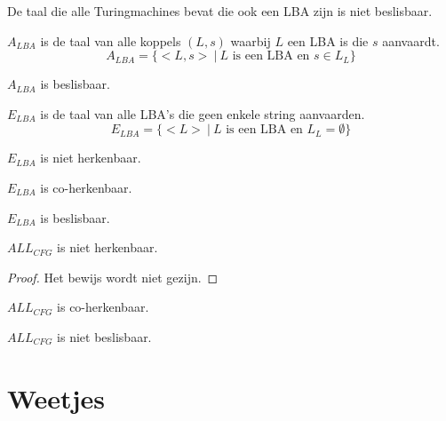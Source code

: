 \documentclass[main.tex]{subfiles}
\begin{document}
\begin{st}
  De taal die alle Turingmachines bevat die ook een LBA zijn is niet beslisbaar.
\end{st}

\begin{de}
  \label{de:a-lba}
  $A_{LBA}$ is de taal van alle koppels $(L,s)$ waarbij $L$ een LBA is die $s$ aanvaardt.
  \[ A_{LBA} = \{ <L,s> \ |\ L \text{ is een LBA en } s \in L_{L}\} \]
\end{de}

\begin{st}
  $A_{LBA}$ is beslisbaar.
\end{st}

\begin{de}
  \label{de:e-lba}
  $E_{LBA}$ is de taal van alle LBA's die geen enkele string aanvaarden.
  \[ E_{LBA} = \{ <L> \ |\ L \text{ is een LBA en } L_{L} = \emptyset \} \]
\end{de}

\begin{st}
  $E_{LBA}$ is niet herkenbaar.
\end{st}

\begin{st}
  $E_{LBA}$ is co-herkenbaar.
\end{st}

\begin{gev}
  $E_{LBA}$ is beslisbaar.
\end{gev}


\begin{st}
  $ALL_{CFG}$ is niet herkenbaar.
  \begin{proof}
    Het bewijs wordt niet gezijn.
  \end{proof}
\end{st}

\begin{st}
  $ALL_{CFG}$ is co-herkenbaar.
\end{st}

\begin{gev}
  $ALL_{CFG}$ is niet beslisbaar.
\end{gev}


\section{Weetjes}
\label{sec:weetjes}
\end{document}
